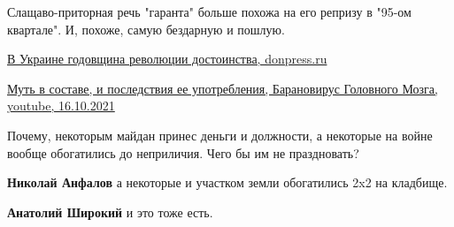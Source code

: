\begin{itemize}

Слащаво-приторная речь "гаранта" больше похожа на его репризу в "95-ом
квартале". И, похоже, самую бездарную и пошлую.


\href{https://donpress.ru/v-ukraine-godovshhina-revoljucii-dostoinstva}{%
В Украине годовщина революции достоинства, donpress.ru%
}


\href{https://www.youtube.com/watch?v=VMCVY52yi68}{%
Муть в составе, и последствия ее употребления, Барановирус Головного Мозга, youtube, 16.10.2021%
}


Почему, некоторым майдан принес деньги и должности, а некоторые на войне вообще
обогатились до неприличия. Чего бы им не праздновать?

\begin{itemize} %
\textbf{Николай Анфалов} а некоторые и участком земли обогатились 2x2 на кладбище.

\textbf{Анатолий Широкий} и это тоже есть.
\end{itemize} %



\end{itemize} %

